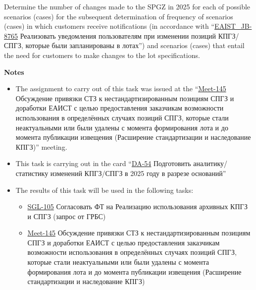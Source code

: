 \documentclass[
]{article}
\begin{document}
Determine the number of changes made to the SPGZ in 2025 for each of
possible scenarios (cases) for the subsequent determination of frequency
of scenarios (cases) in which customers receive notifications (in
accordance with
``\href{https://pm.mos.ru/issue/EAIST_JB-8765}{EAIST\_JB-8765}
Реализовать уведомления пользователям при изменении позиций КПГЗ/СПГЗ,
которые были запланированы в лотах'') and scenarios (cases) that entail
the need for customers to make changes to the lot specifications.

\textbf{Notes}

\begin{itemize}
\item
  The assignment to carry out of this task was issued at the
  ``\href{https://youtrack.gbuac.moscow/issue/Meet-145/Obsuzhdenie-privyazki-STZ-k-nestandartizirovannym-poziciyam-SPGZ-i-dorabotki-EAIST-s-celyu-predostavleniya-zakazchikam}{Meet-145}
  Обсуждение привязки СТЗ к нестандартизированным позициям СПГЗ и
  доработки ЕАИСТ с целью предоставления заказчикам возможности
  использования в определённых случаях позиций СПГЗ, которые стали
  неактуальными или были удалены с момента формирования лота и до
  момента публикации извещения (Расширение стандартизации и наследование
  КПГЗ)'' meeting.
\item
  This task is carrying out in the card
  ``\href{https://youtrack.gbuac.moscow/issue/DA-54/Podgotovit-analitiku-statistiku-izmenenij-KPGZ-SPGZ-v-2025-godu-v-razreze-osnovanij}{DA-54}
  Подготовить аналитику/статистику изменений КПГЗ/СПГЗ в 2025 году в
  разрезе оснований''
\item
  The results of this task will be used in the following tasks:

  \begin{itemize}
  \item
    \href{https://youtrack.gbuac.moscow/issue/SGL-105/Soglasovat-FT-na-Realizaciyu-ispolzovaniya-arhivnyh-KPGZ-i-SPGZ-zapros-ot-GRBS}{SGL-105}
    Согласовать ФТ на Реализацию использования архивных КПГЗ и СПГЗ
    (запрос от ГРБС)
  \item
    \href{https://youtrack.gbuac.moscow/issue/Meet-145/Obsuzhdenie-privyazki-STZ-k-nestandartizirovannym-poziciyam-SPGZ-i-dorabotki-EAIST-s-celyu-predostavleniya-zakazchikam}{Meet-145}
    Обсуждение привязки СТЗ к нестандартизированным позициям СПГЗ и
    доработки ЕАИСТ с целью предоставления заказчикам возможности
    использования в определённых случаях позиций СПГЗ, которые стали
    неактуальными или были удалены с момента формирования лота и до
    момента публикации извещения (Расширение стандартизации и
    наследование КПГЗ)
  \end{itemize}
\end{itemize}
\end{document}
